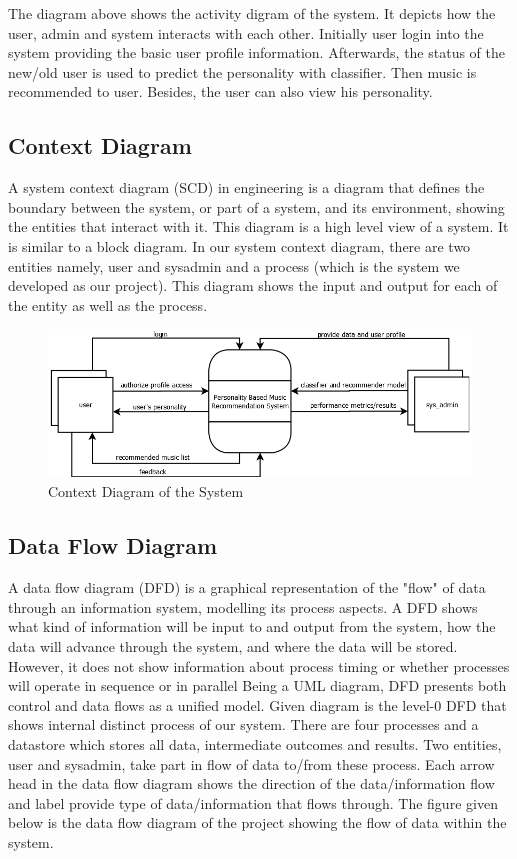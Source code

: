 The diagram above shows the activity digram of the system. It depicts how the user, admin and system interacts with each other. Initially user login into the system providing the basic user profile information. Afterwards, the status of the new/old user is used to predict the personality with classifier. Then music is recommended to user. Besides, the user can also view his personality.

\newpage
\subsection{Context Diagram}

A system context diagram (SCD) in engineering is a diagram that defines the boundary between the system, or part of a system, and its environment, showing the entities that interact with it. This diagram is a high level view of a system. It is similar to a block diagram. In our system context diagram, there are two entities namely, user and sysadmin and a process (which is the system we developed as our project). This diagram shows the input and output for each of the entity as well as the process.
\begin{figure}[!ht]

\centering
\includegraphics[width = 16 cm]{fig/new/dfd0.png}
\caption{Context Diagram of the System}
\label{fig:dfd0}
\end{figure}
\subsection{Data Flow Diagram}
A data flow diagram (DFD) is a graphical representation of the "flow" of data through an information system, modelling its process aspects. A DFD shows what kind of information will be input to and output from the system, how the data will advance through the system, and where the data will be stored. However, it does not show information about process timing or whether processes will operate in sequence or in parallel Being a UML diagram, DFD presents both control and data flows as a unified model. Given diagram is the level-0 DFD that shows internal distinct process of our system. There are four processes and a datastore which stores all data, intermediate outcomes and results. Two entities, user and sysadmin, take part in flow of data to/from these process. Each arrow head in the data flow diagram shows the direction of the data/information flow and label provide type of data/information that flows through.
The figure given below is the data flow diagram of the project showing the flow of data within the system.


